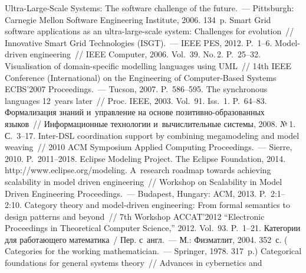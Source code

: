 \begin{multicols}{2}
{\small\frenchspacing
 {%
 \begin{thebibliography}{99}
Ultra-Large-Scale Systems: The software challenge of the future.~--- Pittsburgh: Carnegie Mellon 
Software Engineering Institute, 2006. 134~p.
 Smart Grid software applications as an  
ultra-large-scale system: Challenges for evolution~// Innovative Smart Grid Technologies 
(\mbox{ISGT}).~--- IEEE PES, 2012. P.~1--6.
 Model-driven engineering~// IEEE Computer, 2006. Vol.~39. No.\,2.  
P.~25--32.
 Visualisation of domain-specific modelling languages using 
UML~// 14th IEEE  Conference (International) on the Engineering of Computer-Based Systems 
ECBS'2007 Proceedings.~--- Tucson, 2007. P.~586--595.
 The 
synchronous languages 12~years later~// Proc. IEEE, 2003. Vol.~91. Iss.~1. P.~64--83.
 Формализация знаний и~управление на основе позитивно-образованных 
языков~// Информационные технологии и~вычислительные системы, 2008. №\,1. С.~3--17.
 Inter-DSL 
coordination support by combining megamodeling and model weaving~// 2010 ACM Symposium 
Applied Computing Proceedings.~--- Sierre, 2010. P.~2011--2018.
Eclipse Modeling Project. The Eclipse Foundation, 2014. {\sf http://www.eclipse.org/modeling}.
 A~research 
roadmap towards achieving scalability in model driven engineering~//  Workshop on Scalability in 
Model Driven Engineering Proceedings.~--- Budapest, Hungary: ACM, 2013. P.~2:1--2:10.
 Category theory and model-driven engineering: From formal 
semantics to design patterns and beyond~//  7th Workshop ACCAT'2012 ``Electronic Proceedings 
in Theoretical Computer Science,'' 2012. Vol.~93. P.~1--21.
 Категории для работающего математика~/ Пер. с~англ.~--- М.: Физматлит, 
2004. 352~с. ( Categories for the working mathematician.~--- Springer, 1978. 
317~p.)
 Categorical foundations for general systems theory~// Advances in cybernetics and 

\end{thebibliography}}}
\end{multicols}
